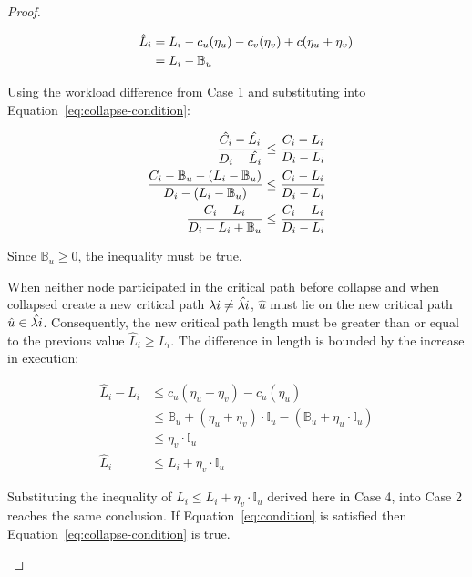 \begin{theorem}
\begin{proof}
\begin{case}
      \begin{align*}
        \indent
        \hat{L}_i &= L_i - c_u(\eta_u) - c_v(\eta_v) + c(\eta_u +
            \eta_v) \\
        &= L_i - \mathbb{B}_u
      \end{align*}

      Using the workload difference from Case 1 and substituting into
      Equation~\ref{eq:collapse-condition}:

      \begin{align*}
        \indent
        \frac{\hat{C_i} - \hat{L_i}} 
             {D_i - \hat{L_i}} &\le
        \frac{C_i - L_i} 
             {D_i - L_i} \\
        \frac{C_i - \mathbb{B}_u - (L_i - \mathbb{B}_u)}
             {D_i - (L_i - \mathbb{B}_u)}
             &\le
        \frac{C_i - L_i} 
             {D_i - L_i} \\
        \frac{C_i - L_i}
             {D_i - L_i + \mathbb{B}_u}
             &\le
        \frac{C_i - L_i} 
             {D_i - L_i}
      \end{align*}

      Since ${\mathbb{B}_u \ge 0}$, the inequality must be true.
    \end{case}

    
    \begin{case}
      When neither node participated in the critical path before
      collapse and when collapsed create a new critical path
      ${\lambda{i} \not = \hat{\lambda{i}}}$, ${\hat{u}}$
      must lie on the new critical path
      ${\hat{u} \in \hat{\lambda{i}}}$. Consequently, the
      new critical path length must be greater than or equal to the
      previous value ${\hat{L}_i \ge L_i}$. The difference in length
      is bounded by the increase in execution:

      \begin{align*}
        \hat{L}_i - L_i &\le c_u(\eta_u + \eta_v) - c_u(\eta_u) \\
        &\le \mathbb{B}_u + (\eta_u + \eta_v) \cdot \mathbb{I}_u
            - (\mathbb{B}_u + \eta_u \cdot \mathbb{I}_u) \\
        &\le \eta_v \cdot \mathbb{I}_u \\
        \hat{L}_i & \le L_i + \eta_v \cdot \mathbb{I}_u
      \end{align*}

      Substituting the inequality of
      ${\hat{L}_i \le L_i + \eta_v \cdot \mathbb{I}_u}$ derived here in
      Case 4, into Case 2 reaches the same conclusion. If
      Equation~\ref{eq:condition} is satisfied then
      Equation~\ref{eq:collapse-condition} is true.
    \end{case}


\end{proof}
\end{theorem}
